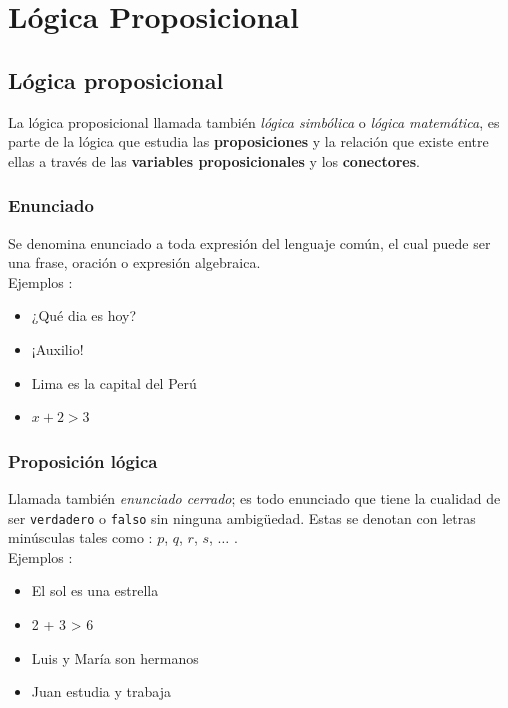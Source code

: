 \documentclass[10pt, twocolumn, landscape, a4paper]{article}
\begin{document}
\section*{Lógica Proposicional}

\subsection*{Lógica proposicional}

\noindent La lógica proposicional llamada también \emph{lógica simbólica} o \emph{lógica matemática}, es parte de la lógica que estudia las \textbf{proposiciones} y la relación que existe entre ellas a través de las \textbf{variables proposicionales} y los \textbf{conectores}.

\subsubsection*{Enunciado}

\noindent Se denomina enunciado a toda expresión del lenguaje común, el cual puede ser una frase, oración o expresión algebraica. \\

\noindent Ejemplos :
\begin{itemize}[noitemsep]
\item{¿Qué dia es hoy?}
\item{¡Auxilio!}
\item{Lima es la capital del Perú}
\item{$x + 2 > 3$}
\end{itemize}

\subsubsection*{Proposición lógica}
\noindent Llamada también \emph{enunciado cerrado}; es todo enunciado que tiene la cualidad de ser {\tt verdadero} o {\tt falso} sin ninguna ambigüedad. Estas se denotan con letras minúsculas tales como : $p$, $q$, $r$, $s$, $\ldots$ . \\

\noindent Ejemplos :
\begin{itemize}[noitemsep]
\item{El sol es una estrella}
\item{2 + 3 > 6}
\item{Luis y María son hermanos}
\item{Juan estudia y trabaja} 
\end{itemize}
\end{document}
